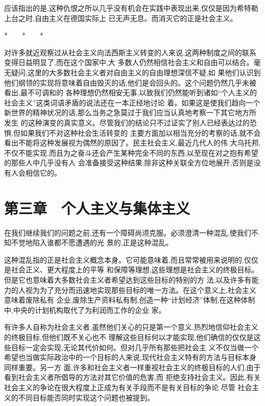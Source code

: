 ﻿\documentclass[12pt]{article}
\begin{document}
应该指出的是,这种仇恨之所以几乎没有机会在实践中表现出来,仅仅是因为希特勒上台之时,自由主义在德国实际上
已无声无息。而消灭它的正是社会主义。

*　　*　　*

对许多就近观察过从社会主义向法西斯主义转变的人来说,这两种制度之间的联系变得日益明显了,而在这个国家中,大
多数人仍然相信社会主义和自由可以结合。毫无疑问,这里的大多数社会主义者对自由主义的自由理想深信不疑,如
果他们认识到他们纲领的实现将意味着自由毁灭的话,他们是会回头的。这个问题仍然几乎未被看出,最不可调和的
各种理想仍然相安无事,以致我们仍然能听到诸如``个人主义的社会主义''这类词语矛盾的说法还在一本正经地讨论
着。如果这是使我们趋向一个新世界的精神状况的话,那么当务之急莫过于我们应当认真地考察一下其它地方所发生
的这种演变的真实意义。尽管我们的结论只不过证实了别人已经表达过的恐惧,但如果我们不对这种社会生活转变的
主要方面加以相当充分的考察的话,就不会看出不能将这种发展视为偶然的原因了。民主社会主义,最近几代人的伟
大乌托邦,不仅不能实现,而且为之奋斗还会产生某种完全不同的东西,以至现在对之抱有希望的那些人中几乎没有人
会准备接受这种结果;除非这种关联全方位地展开,否则是没有人会相信它的。



\section{第三章　个人主义与集体主义}


在我们继续我们的问题之前,还有一个障碍尚须克服。必须澄清一种混乱,使我们不知不觉地陷入谁都不愿遭遇的光
景的,正是这种混乱。

这种混乱指的正是社会主义概念本身。它可能意味着,而且常常被用来说明的,仅仅是社会正义、更大程度上的平等
和保障等理想,这些理想是社会主义的终极目标。但是它也意味着大多数社会主义者希望达到这些目标的特别的方
法,以及许多有能力的人视为为了充分而迅速地实现那些目标的唯一方法。在这个意义上,社会主义意味着废除私有
企业,废除生产资料私有制,创造一种``计划经济''体制,在这种体制中,中央的计划机构取代了为利润而工作的企业
家。

有许多人自称为社会主义者,虽然他们关心的只是第一个意义,热烈地信仰社会主义的终极目标,但他们既不关心也不
理解这些目标何以才能实现,他们确信的仅仅是这些目标一定会实现,无论其代价如何。但对几乎所有那些把社会主
义不仅当做一个希望也当做实际政治中的一个目标的人来说,现代社会主义特有的方法与目标本身同样重要。另一方
面,许多和社会主义者一样重视社会主义的终极目标的人们,由于看到社会主义者所倡导的方法对其它价值的危害,而
拒绝支持社会主义。因此,有关社会主义的争论在很大程度上正成为有关手段而不是有关目标的争论 \myrule 尽管
社会主义的不同目标能否同时实现这个问题也被提到。
\end{document}
